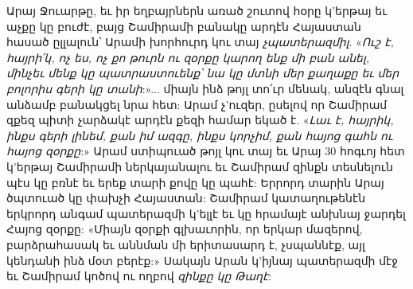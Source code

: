 \documentclass{article}
\begin{document}
{Արայ Ջուարթը, եւ իր եղբայրներն առած շուտով հօրը կ'երթայ եւ աչքը կը բուժէ, բայց Շամիրամի բանակը արդէն Հայաստան հասած ըլլալուն՝ Արամի խորհուրդ կու տայ \emph{չպատերազմիլ}. «\emph{Ուշ է, հայրի՛կ, ոչ ես, ոչ քո թուրն ու զօրքը կարող ենք մի բան անել, մինչեւ մենք կը պատրաստուենք՝ նա կը մտնի մեր քաղաքը եւ մեր բոլորիս գերի կը տանի}:»... միայն ինձ թոյլ տո՛ւր մենակ, անզէն գնալ անձամբ բանակցել նրա հետ: Արամ չ'ուզեր, ըսելով որ Շամիրամ զքեզ պիտի չարձակէ արդէն քեզի համար եկած է. «\emph{Լաւ է, հայրիկ, ինքս գերի լինեմ, քան իմ ազգը, ինքս կորչիմ, քան հայոց գահն ու հայոց զօրքը}:» Արամ ստիպուած թոյլ կու տայ եւ Արայ 30 հոգւոյ հետ կ'երթայ Շամիրամի ներկայանալու եւ Շամիրամ զինքն տեսնելուն պէս կը բռնէ եւ երեք տարի քովը կը պահէ: Երրորդ տարին Արայ ծպտուած կը փախչի Հայաստան: Շամիրամ կատաղութենէն երկրորդ անգամ պատերազմի կ'ելլէ եւ կը հրամայէ անխնայ ջարդել Հայոց զօրքը: «Միայն զօրքի գլխաւորին, որ երկար մազերով, բարձրահասակ եւ աննման մի երիտասարդ է, չսպաննէք, այլ կենդանի ինձ մօտ բերէք:» Սակայն Արան կ'իյնայ պատերազմի մէջ եւ Շամիրամ կոծով ու ողբով \emph{զինքը կը Թաղէ}:

}
\end{document}
